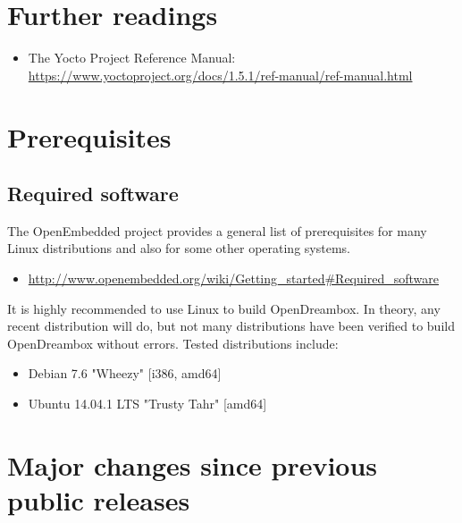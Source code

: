 \documentclass[a4paper]{article}
\begin{document}
\section{Further readings}
      \begin{itemize}
        \item The Yocto Project Reference Manual:
              \url{https://www.yoctoproject.org/docs/1.5.1/ref-manual/ref-manual.html}
      \end{itemize}

\section{Prerequisites}
  \label{prerequisites}

  \subsection{Required software}

   The OpenEmbedded project provides a general list of prerequisites for
   many Linux distributions and also for some other operating systems.

   \begin{itemize}
     \item \url{http://www.openembedded.org/wiki/Getting\_started#Required\_software}
   \end{itemize}

   It is highly recommended to use Linux to build OpenDreambox. In theory,
   any recent distribution will do, but not many distributions have been
   verified to build OpenDreambox without errors. Tested distributions
   include:

   \begin{itemize}
     \item Debian 7.6 "Wheezy" [i386, amd64]
     \item Ubuntu 14.04.1 LTS "Trusty Tahr" [amd64]
   \end{itemize}

\pagebreak

\section{Major changes since previous public releases}
\end{document}
